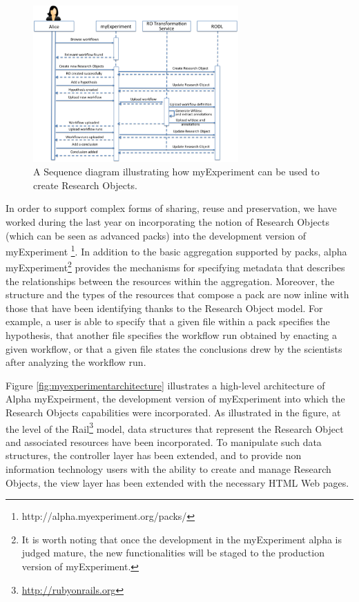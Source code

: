 \begin{figure}
\begin{center}
\includegraphics[width=0.7\textwidth]{Figures/myexperimentInteractions.png}
\end{center}
\caption{A Sequence diagram illustrating how myExperiment can be used to create Research Objects.}
\label{fig:myexperimentinteractions}
\end{figure} 
 
In order to support complex forms of sharing, reuse and preservation, we have worked during the last year on incorporating the notion of Research Objects (which can be seen as advanced packs) into the development version of myExperiment \footnote{http://alpha.myexperiment.org/packs/}. In addition to the basic aggregation supported by packs, alpha myExperiment\footnote{It is worth noting that once the development in the myExperiment alpha is judged mature, the new functionalities will be staged to the production version of myExperiment.} provides the mechanisms for specifying metadata that describes the relationships between the resources within the aggregation. Moreover, the structure and the types of the resources that compose a pack are now inline with those that have been identifying thanks to the Research Object model. For example, a user is able to specify that a given file within a pack specifies the hypothesis, that another file specifies the workflow run obtained by enacting a given workflow, or that a given file states the conclusions drew by the scientists after analyzing the workflow run.


Figure \ref{fig:myexperimentarchitecture} illustrates a high-level architecture of Alpha myExpeirment, the development version of myExperiment into which the Research Objects capabilities were incorporated. As illustrated in the figure, at the level of the Rail\footnote{\url{http://rubyonrails.org}} model, data structures that represent the Research Object and associated resources have been incorporated. To manipulate such data structures, the controller layer has been extended, and to provide non information technology users with the ability to create and manage Research Objects, the view layer has been extended with the necessary HTML Web pages.



